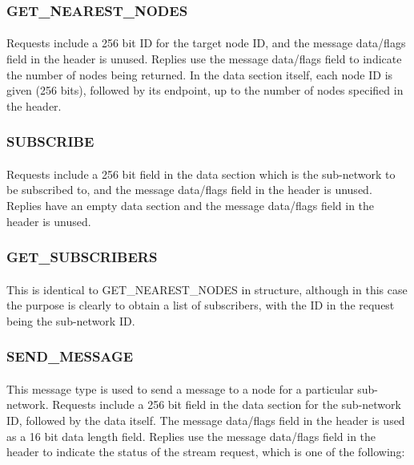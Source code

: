 \documentclass{article}
\begin{document}
\subsubsection{GET\_NEAREST\_NODES}

\paragraph{}
Requests include a 256 bit ID for the target node ID, and the message data/flags field in the header is unused.
Replies use the message data/flags field to indicate the number of nodes being returned. In the data section itself, each node ID is given (256 bits), followed by its endpoint, up to the number of nodes specified in the header.

\subsubsection{SUBSCRIBE}

\paragraph{}
Requests include a 256 bit field in the data section which is the sub-network to be subscribed to, and the message data/flags field in the header is unused.
Replies have an empty data section and the message data/flags field in the header is unused.

\subsubsection{GET\_SUBSCRIBERS}

\paragraph{}
This is identical to GET\_NEAREST\_NODES in structure, although in this case the purpose is clearly to obtain a list of subscribers, with the ID in the request being the sub-network ID.

\subsubsection{SEND\_MESSAGE}

\paragraph{}
This message type is used to send a message to a node for a particular sub-network.
Requests include a 256 bit field in the data section for the sub-network ID, followed by the data itself. The message data/flags field in the header is used as a 16 bit data length field.
Replies use the message data/flags field in the header to indicate the status of the stream request, which is one of the following:
\end{document}
